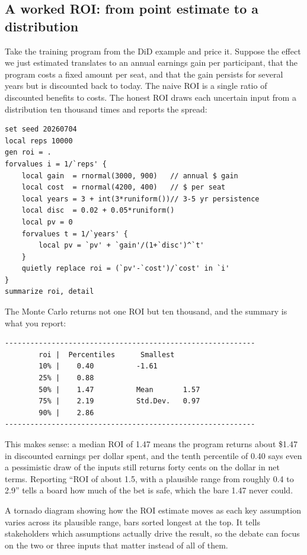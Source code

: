 \documentclass[
    a4paper,
    fontsize=10pt,
    twoside=true,
    numbers=noenddot,
]{kaobook}
\newenvironment{vizcallout}[1][Visualization to build]{%
    \begin{vizbox}[frametitle={#1}]%
}{%
    \end{vizbox}%
}
\begin{document}
\subsection{A worked ROI: from point estimate to a distribution}
Take the training program from the DiD example and price it. Suppose the effect we just estimated translates to an annual earnings gain per participant, that the program costs a fixed amount per seat, and that the gain persists for several years but is discounted back to today. The naive ROI is a single ratio of discounted benefits to costs. The honest ROI draws each uncertain input from a distribution ten thousand times and reports the spread:
{\footnotesize
\begin{verbatim}
set seed 20260704
local reps 10000
gen roi = .
forvalues i = 1/`reps' {
    local gain  = rnormal(3000, 900)   // annual $ gain
    local cost  = rnormal(4200, 400)   // $ per seat
    local years = 3 + int(3*runiform())// 3-5 yr persistence
    local disc  = 0.02 + 0.05*runiform()
    local pv = 0
    forvalues t = 1/`years' {
        local pv = `pv' + `gain'/(1+`disc')^`t'
    }
    quietly replace roi = (`pv'-`cost')/`cost' in `i'
}
summarize roi, detail
\end{verbatim}
}
The Monte Carlo returns not one ROI but ten thousand, and the summary is what you report:
{\footnotesize
\begin{verbatim}
-----------------------------------------------------------
        roi |  Percentiles      Smallest
        10% |    0.40          -1.61
        25% |    0.88
        50% |    1.47          Mean       1.57
        75% |    2.19          Std.Dev.   0.97
        90% |    2.86
-----------------------------------------------------------
\end{verbatim}
}
This makes sense: a median ROI of 1.47 means the program returns about \$1.47 in discounted earnings per dollar spent, and the tenth percentile of 0.40 says even a pessimistic draw of the inputs still returns forty cents on the dollar in net terms. Reporting \enquote{ROI of about 1.5, with a plausible range from roughly 0.4 to 2.9} tells a board how much of the bet is safe, which the bare 1.47 never could.

\begin{vizcallout}[Visualization to build: the tornado chart]
A tornado diagram showing how the ROI estimate moves as each key assumption varies across its plausible range, bars sorted longest at the top. It tells stakeholders which assumptions actually drive the result, so the debate can focus on the two or three inputs that matter instead of all of them.
\end{vizcallout}
\end{document}
